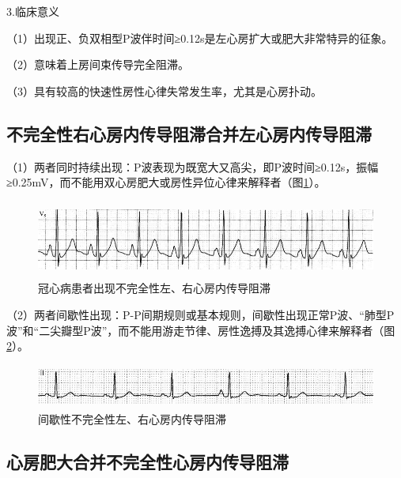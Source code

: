 3.临床意义

（1）出现正、负双相型P波伴时间≥0.12s是左心房扩大或肥大非常特异的征象。

（2）意味着上房间束传导完全阻滞。

（3）具有较高的快速性房性心律失常发生率，尤其是心房扑动。

\protect\hypertarget{text00026.htmlux5cux23subid318}{}{}

\subsection{不完全性右心房内传导阻滞合并左心房内传导阻滞}

（1）两者同时持续出现：P波表现为既宽大又高尖，即P波时间≥0.12s，振幅≥0.25mV，而不能用双心房肥大或房性异位心律来解释者（图\ref{fig19-8}）。

\begin{figure}[!htbp]
 \centering
 \includegraphics[width=5.58333in,height=1in]{./images/Image00324.jpg}
 \captionsetup{justification=centering}
 \caption{冠心病患者出现不完全性左、右心房内传导阻滞}
 \label{fig19-8}
  \end{figure} 

（2）两者间歇性出现：P-P间期规则或基本规则，间歇性出现正常P波、“肺型P波”和“二尖瓣型P波”，而不能用游走节律、房性逸搏及其逸搏心律来解释者（图\ref{fig19-9}）。

\begin{figure}[!htbp]
 \centering
 \includegraphics[width=5.58333in,height=0.57292in]{./images/Image00325.jpg}
 \captionsetup{justification=centering}
 \caption{间歇性不完全性左、右心房内传导阻滞}
 \label{fig19-9}
  \end{figure} 

\protect\hypertarget{text00026.htmlux5cux23subid319}{}{}

\subsection{心房肥大合并不完全性心房内传导阻滞}

